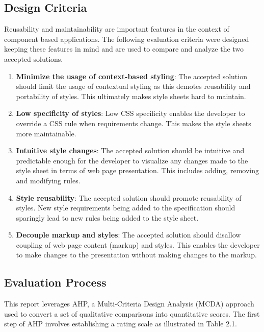 \documentclass[12pt]{article}
\begin{document}
\subsection{Design Criteria}
Reusability and maintainability are important features in the context of component based applications. The following evaluation criteria were designed keeping these features in mind and are used to compare and analyze the two accepted solutions.
\begin{enumerate}

	\item \textbf{Minimize the usage of context-based styling}: The accepted solution should limit the usage of contextual styling as this demotes reusability and portability of styles. This ultimately makes style sheets hard to maintain.

	\item \textbf{Low specificity of styles}: Low CSS specificity enables the developer to override a CSS rule when requirements change. This makes the style sheets more maintainable.

	\item \textbf{Intuitive style changes}: The accepted solution should be intuitive and predictable enough for the developer to visualize any changes made to the style sheet in terms of web page presentation. This includes adding, removing and modifying rules.

	\item \textbf{Style reusability}: The accepted solution should promote reusability of styles. New style requirements being added to the specification should sparingly lead to new rules being added to the style sheet.

	\item \textbf{Decouple markup and styles}: The accepted solution should disallow coupling of web page content (markup) and styles. This enables the developer to make changes to the presentation without making changes to the markup.

\end{enumerate}

\subsection{Evaluation Process}
This report leverages AHP, a Multi-Criteria Design Analysis (MCDA) approach used to convert a set of qualitative comparisons into quantitative scores. The first step of AHP involves establishing a rating scale as illustrated in Table 2.1.
\end{document}

